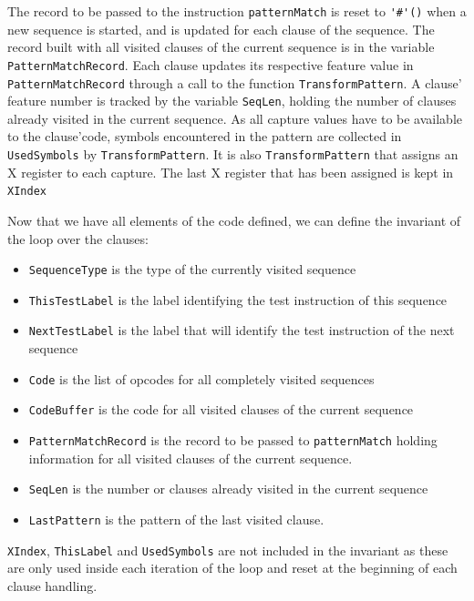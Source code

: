 \documentclass[a4paper]{memoir}
\begin{document}
The record to be passed to the instruction \lstinline!patternMatch! is reset to
\lstinline!'#'()! when a new sequence is started, and is updated for each clause
of the sequence. The record built with all visited clauses of the current
sequence is in the variable \lstinline!PatternMatchRecord!.
Each clause updates its respective feature value in
\lstinline!PatternMatchRecord! through a call to the function \lstinline!TransformPattern!.
A clause' feature number is tracked by the
variable \lstinline!SeqLen!, holding the number of clauses already visited in
the current sequence.
As all capture values have to be available to the clause'code, symbols encountered
in the pattern are collected in \lstinline!UsedSymbols! by
\lstinline!TransformPattern!. It is also \lstinline!TransformPattern! that
assigns an X register to each capture. The last X register that has been
assigned is kept in \lstinline!XIndex!

Now that we have all elements of the code defined, we can define the invariant
of the loop over the clauses:

\begin{itemize}
  \item \lstinline!SequenceType! is the type of the currently visited sequence 
  \item \lstinline!ThisTestLabel! is the label identifying the test instruction of this sequence
  \item \lstinline!NextTestLabel! is the label that will identify the test
    instruction of the next sequence
  \item \lstinline!Code! is the list of opcodes for all completely visited sequences
  \item \lstinline!CodeBuffer! is the code for all visited clauses of the current sequence
  \item \lstinline!PatternMatchRecord! is the record to be passed to \lstinline!patternMatch!
        holding information for all visited clauses of the current sequence.
  \item \lstinline!SeqLen! is the number or clauses already visited in the current sequence
  \item \lstinline!LastPattern! is the pattern of the last visited clause.
\end{itemize}

\lstinline!XIndex!, \lstinline!ThisLabel! and \lstinline!UsedSymbols! are not
included in the invariant as these are only used inside
each iteration of the loop and reset at the beginning of each clause handling.
\end{document}
